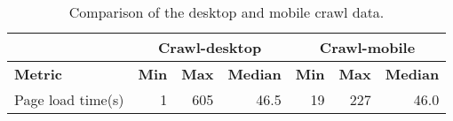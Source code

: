 \begin{table}[ht] 
\caption{Comparison of the desktop and mobile crawl data.} 
\centering 
\begin{tabular}{|l|rrl|lll|} 
\hline 
\textbf{} & \multicolumn{3}{c|}{\textbf{Crawl-desktop}} & \multicolumn{3}{c|}{\textbf{Crawl-mobile}} \\ \hline 
\textbf{Metric} & \multicolumn{1}{r|}{\textbf{Min}} & \multicolumn{1}{r|}{\textbf{Max}} & \textbf{Median} & \multicolumn{1}{l|}{\textbf{Min}} & \multicolumn{1}{l|}{\textbf{Max}} & \textbf{Median} \\ \hline 
Page load time(s) & \multicolumn{1}{r|}{1} & \multicolumn{1}{r|}{605} & \multicolumn{1}{r|}{46.5} & \multicolumn{1}{r|}{19} & \multicolumn{1}{r|}{227} & \multicolumn{1}{r|}{46.0} \\ \hline 
\end{tabular} 
\label{table:Comparison} 
\end{table}